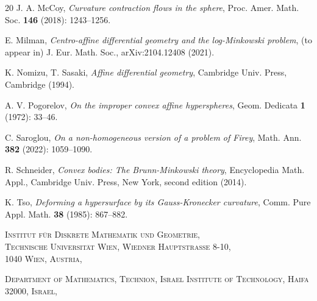 \documentclass[12pt]{amsart}
\theoremstyle{definition}
\numberwithin{equation}{section}
\theoremstyle{remark}
\numberwithin{equation}{section}
\begin{document}
\begin{thebibliography}{20}
  J. A. McCoy, \textit{Curvature contraction flows in the sphere}, Proc. Amer. Math. Soc. \textbf{146} (2018): 1243--1256.


 E. Milman, \textit{Centro-affine differential geometry and the log-Minkowski problem}, (to appear in) J. Eur. Math. Soc., arXiv:2104.12408 (2021).

 K. Nomizu, T. Sasaki, \textit{Affine differential geometry}, Cambridge Univ. Press, Cambridge (1994).

 A. V. Pogorelov, \textit{On the improper convex affine hyperspheres}, Geom. Dedicata \textbf{1} (1972): 33--46.

 C. Saroglou, \textit{On a non-homogeneous version of a problem of Firey}, Math. Ann. \textbf{382} (2022): 1059--1090.

 R. Schneider, \textit{Convex bodies: The Brunn-Minkowski theory}, Encyclopedia Math. Appl., Cambridge Univ. Press, New York, second edition (2014).

 K. Tso, \textit{Deforming a hypersurface by its Gauss-Kronecker curvature}, Comm. Pure Appl. Math. \textbf{38} (1985): 867--882.

\end{thebibliography}

\vspace{10mm}
\textsc{Institut f\"{u}r Diskrete Mathematik und Geometrie,\\ Technische Universit\"{a}t Wien, Wiedner Hauptstra{\ss}e 8-10,\\ 1040 Wien, Austria,} 
		
\vspace{5mm}

\textsc{Department of Mathematics, Technion, Israel Institute of Technology, Haifa 32000, Israel,}
		
\end{document}
